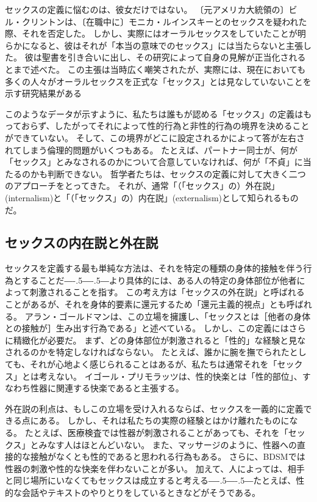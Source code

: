 \documentclass[paper=a4,book,openany]{jlreq}
\newcommand{\ig}[1]{}           %
\def\DDASH{―\kern-.5\zw―\kern-.5\zw―} %
\begin{document}
セックスの定義に悩むのは、彼女だけではない。
〔元アメリカ大統領の〕ビル・クリントンは、〔在職中に〕モニカ・ルインスキーとのセックスを疑われた際、それを否定した。
しかし、実際にはオーラルセックスをしていたことが明らかになると、彼はそれが「本当の意味でのセックス」には当たらないと主張した。
彼は聖書を引き合いに出し、その研究によって自身の見解が正当化されるとまで述べた。
この主張は当時広く嘲笑されたが、実際には、現在においても多くの人々がオーラルセックスを正式な「セックス」とは見なしていないことを示す研究結果がある\citep{dotson-blake12:_explor_social_sexual}

このようなデータが示すように、私たちは誰もが認める「セックス」の定義はもっておらず、したがってそれによって性的行為と非性的行為の境界を決めることができていない。
そして、この境界がどこに設定されるかによって答が左右されてしまう倫理的問題がいくつもある。
たとえば、パートナー同士が、何が「セックス」とみなされるのかについて合意していなければ、何が「不貞」に当たるのかも判断できない。
哲学者たちは、セックスの定義に対して大きく二つのアプローチをとってきた。
それが、通常「（「セックス」の）外在説」(internalism)と「（「セックス」の）内在説」(externalism)として知られるものだ。

\subsection{セックスの内在説と外在説}

セックスを定義する最も単純な方法は、それを特定の種類の身体的接触を伴う行為とすることだ{\DDASH}より具体的には、ある人の特定の身体部位が他者によって刺激されることを指す。
この考え方は「セックスの外在説」と呼ばれることがあるが、それを身体的要素に還元するため「還元主義的視点」とも呼ばれる。
アラン・ゴールドマンは、この立場を擁護し、「セックスとは［他者の身体との接触が］生み出す行為である」と述べている\citep[p.268]{goldman77:_plain_sex}。\ig{Alan Goldman}
しかし、この定義にはさらに精緻化が必要だ。
まず、どの身体部位が刺激されると「性的」な経験と見なされるのかを特定しなければならない。
たとえば、誰かに腕を撫でられたとしても、それが心地よく感じられることはあるが、私たちは通常それを「セックス」とは考えない。
イゴール・プリモラッツは、性的快楽とは「性的部位」、すなわち性器に関連する快楽であると主張する\citep[p.46]{primoratz99:_ethic_and_sex}。

外在説の利点は、もしこの立場を受け入れるならば、セックスを一義的に定義できる点にある。
しかし、それは私たちの実際の経験とはかけ離れたものになる。
たとえば、医療検査では性器が刺激されることがあっても、それを「セックス」とみなす人はほとんどいない。
また、マッサージのように、性器への直接的な接触がなくとも性的であると思われる行為もある。
さらに、BDSMでは性器の刺激や性的な快楽を伴わないことが多い。
加えて、人によっては、相手と同じ場所にいなくてもセックスは成立すると考える{\DDASH}たとえば、性的な会話やテキストのやりとりをしているときなどがそうである\citep[pp. 19--20]{soble06:_activ_sexual}。
\end{document}
